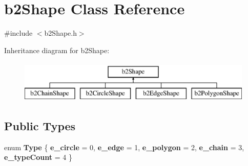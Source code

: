 \hypertarget{classb2Shape}{}\section{b2\+Shape Class Reference}
\label{classb2Shape}


{\ttfamily \#include $<$b2\+Shape.\+h$>$}

Inheritance diagram for b2\+Shape\+:\begin{figure}[H]
\begin{center}
\leavevmode
\includegraphics[height=2.000000cm]{classb2Shape}
\end{center}
\end{figure}
\subsection*{Public Types}
\begin{DoxyCompactItemize}
\item 
\mbox{\label{classb2Shape_a4c1f3a9ad6b3150bb90ad9018ca4b1e0}} 
enum {\bfseries Type} \{ \newline
{\bfseries e\+\_\+circle} = 0, 
{\bfseries e\+\_\+edge} = 1, 
{\bfseries e\+\_\+polygon} = 2, 
{\bfseries e\+\_\+chain} = 3, 
\newline
{\bfseries e\+\_\+type\+Count} = 4
 \}
\end{DoxyCompactItemize}
